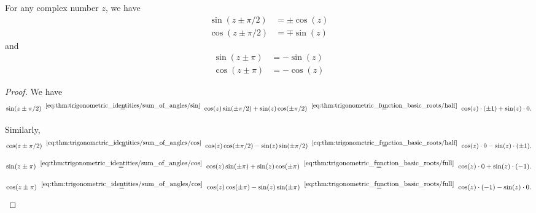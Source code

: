 \begin{proposition}\label{thm:trigonometric_function_period_identities}
  For any complex number \( z \), we have
  \begin{align}
    \sin(z \pm \pi / 2) &= \pm \cos(z) \label{eq:thm:trigonometric_function_period_identities/half/sin} \\
    \cos(z \pm \pi / 2) &= \mp \sin(z) \label{eq:thm:trigonometric_function_period_identities/half/cos}
  \end{align}
  and
  \begin{align}
    \sin(z \pm \pi) &= -\sin(z) \label{eq:thm:trigonometric_function_period_identities/full/sin} \\
    \cos(z \pm \pi) &= -\cos(z) \label{eq:thm:trigonometric_function_period_identities/full/cos}
  \end{align}
\end{proposition}
\begin{proof}
   We have
  \begin{equation*}
    \sin(z \pm \pi / 2)
    \reloset {\eqref{eq:thm:trigonometric_identities/sum_of_angles/sin}} =
    \cos(z) \sin(\pm \pi / 2) + \sin(z) \cos(\pm \pi / 2)
    \reloset {\eqref{eq:thm:trigonometric_function_basic_roots/half}} =
    \cos(z) \cdot (\pm 1) + \sin(z) \cdot 0.
  \end{equation*}

   Similarly,
  \begin{equation*}
    \cos(z \pm \pi / 2)
    \reloset {\eqref{eq:thm:trigonometric_identities/sum_of_angles/cos}} =
    \cos(z) \cos(\pm \pi / 2) - \sin(z) \sin(\pm \pi / 2)
    \reloset {\eqref{eq:thm:trigonometric_function_basic_roots/half}} =
    \cos(z) \cdot 0 - \sin(z) \cdot (\pm 1).
  \end{equation*}

  \begin{equation*}
    \sin(z \pm \pi)
    \reloset {\eqref{eq:thm:trigonometric_identities/sum_of_angles/cos}} =
    \cos(z) \sin(\pm \pi) + \sin(z) \cos(\pm \pi)
    \reloset {\eqref{eq:thm:trigonometric_function_basic_roots/full}} =
    \cos(z) \cdot 0 + \sin(z) \cdot (-1).
  \end{equation*}

  \begin{equation*}
    \cos(z \pm \pi)
    \reloset {\eqref{eq:thm:trigonometric_identities/sum_of_angles/cos}} =
    \cos(z) \cos(\pm \pi) - \sin(z) \sin(\pm \pi)
    \reloset {\eqref{eq:thm:trigonometric_function_basic_roots/full}} =
    \cos(z) \cdot (-1) - \sin(z) \cdot 0.
  \end{equation*}
\end{proof}

